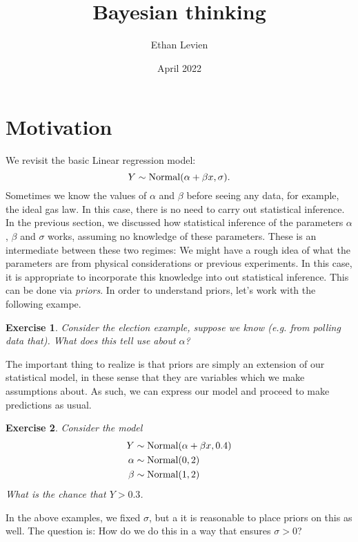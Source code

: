\documentclass{amsart}
\title{Bayesian thinking}
\author{Ethan Levien}
\date{April 2022}
\newtheorem{exercise}{Exercise}
\begin{document}
\maketitle

\tableofcontents



\section{Motivation}
We revisit the basic Linear regression model:
\begin{equation}
Y \sim {\rm Normal}(\alpha + \beta x,\sigma).
\end{equation} 
Sometimes we know the values of $\alpha$ and $\beta$ before seeing any data, for example, the ideal gas law. In this case, there is no need to carry out statistical inference. In the previous section, we discussed how statistical inference of the parameters $\alpha$, $\beta$ and $\sigma$ works, assuming no knowledge of these parameters. These is an intermediate between these two regimes: We might have a rough idea of what the parameters are from physical considerations or previous experiments. In this case, it is appropriate to incorporate this knowledge into out statistical inference. This can be done via \emph{priors}. In order to understand priors, let's work with the following exampe. 

\begin{exercise} Consider the election example, suppose we know (e.g. from polling data that). What does this tell use about $\alpha$? 
\end{exercise}

The important thing to realize is that priors are simply an extension of our statistical model, in these sense that they are variables which we make assumptions about. As such, we can express our model and proceed to make predictions as usual.

\begin{exercise}
Consider the model 
\begin{align}
Y &\sim {\rm Normal}(\alpha + \beta x,0.4)\\
\alpha &\sim {\rm Normal}(0,2)\\
\beta &\sim {\rm Normal}(1,2)
\end{align}
What is the chance that $Y>0.3$.
\end{exercise}
In the above examples, we fixed $\sigma$, but a it is reasonable to place priors on this as well. The question is: How do we do this in a way that ensures $\sigma>0$? 
\end{document}
